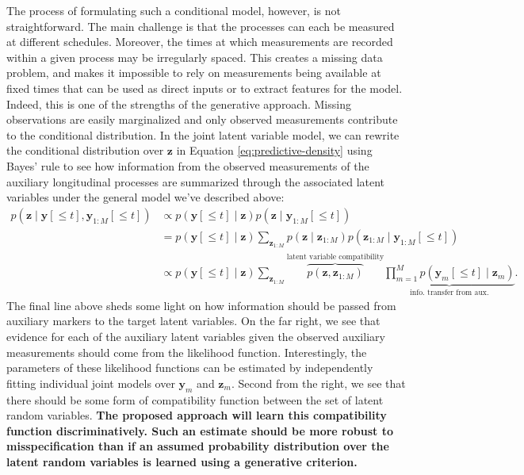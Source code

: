 \documentclass[12pt]{article}
\newcommand{\given}{\mid}
\begin{document}
The process of formulating such a conditional model, however, is not straightforward. The main challenge is that the processes can each be measured at different schedules. Moreover, the times at which measurements are recorded within a given process may be irregularly spaced. This creates a missing data problem, and makes it impossible to rely on measurements being available at fixed times that can be used as direct inputs or to extract features for the model. Indeed, this is one of the strengths of the generative approach. Missing observations are easily marginalized and only observed measurements contribute to the conditional distribution. In the joint latent variable model, we can rewrite the conditional distribution over $\bm{z}$ in Equation \ref{eq:predictive-density} using Bayes' rule to see how information from the observed measurements of the auxiliary longitudinal processes are summarized through the associated latent variables under the general model we've described above:
\begin{align}
\label{eq:target-latent-variable-predictive}
p(\bm{z} \given \bm{y}[\le t], \bm{y}_{1:M}[\le t])
	&\propto p(\bm{y}[\le t] \given \bm{z}) p(\bm{z} \given \bm{y}_{1:M}[\le t]) \\
\nonumber
	&=       p(\bm{y}[\le t] \given \bm{z}) \sum_{\bm{z}_{1:M}} p(\bm{z} \given \bm{z}_{1:M}) p(\bm{z}_{1:M} \given \bm{y}_{1:M}[\le t]) \\
\label{eq:joint-latent-variable-conditional}
	&\propto
		p(\bm{y}[\le t] \given \bm{z})
		\sum_{\bm{z}_{1:M}}
			\overbrace{p(\bm{z}, \bm{z}_{1:M})}^{\text{latent variable compatibility}}
			\underbrace{\prod_{m=1}^M p(\bm{y}_m[\le t] \given \bm{z}_m)}_{\text{info. transfer from aux.}}.
\end{align}
The final line above sheds some light on how information should be passed from auxiliary markers to the target latent variables. On the far right, we see that evidence for each of the auxiliary latent variables given the observed auxiliary measurements should come from the likelihood function. Interestingly, the parameters of these likelihood functions can be estimated by independently fitting individual joint models over $\bm{y}_m$ and $\bm{z}_m$. Second from the right, we see that there should be some form of compatibility function between the set of latent random variables. \textbf{The proposed approach will learn this compatibility function discriminatively. Such an estimate should be more robust to misspecification than if an assumed probability distribution over the latent random variables is learned using a generative criterion.}
\end{document}
